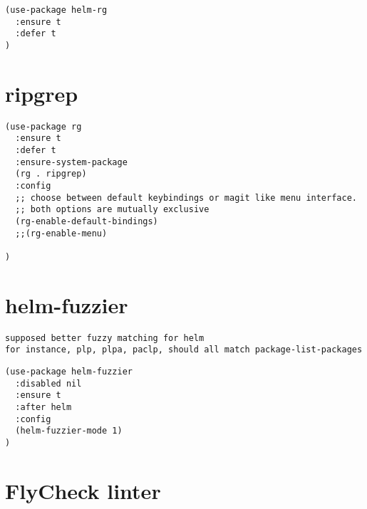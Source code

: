 \documentclass[11pt]{article}
\begin{document}
\begin{verbatim}
(use-package helm-rg
  :ensure t
  :defer t
)
\end{verbatim}

\section*{ripgrep}
\label{sec:orge5f7363}

\begin{verbatim}
(use-package rg
  :ensure t
  :defer t
  :ensure-system-package
  (rg . ripgrep)
  :config
  ;; choose between default keybindings or magit like menu interface.
  ;; both options are mutually exclusive
  (rg-enable-default-bindings)
  ;;(rg-enable-menu)

)
\end{verbatim}

\section*{helm-fuzzier}
\label{sec:orgc0abfe5}
\begin{verbatim}
supposed better fuzzy matching for helm
for instance, plp, plpa, paclp, should all match package-list-packages
\end{verbatim}



\begin{verbatim}
(use-package helm-fuzzier
  :disabled nil
  :ensure t
  :after helm
  :config
  (helm-fuzzier-mode 1)
)
\end{verbatim}

\section*{FlyCheck linter}
\label{sec:org4839286}
\end{document}
